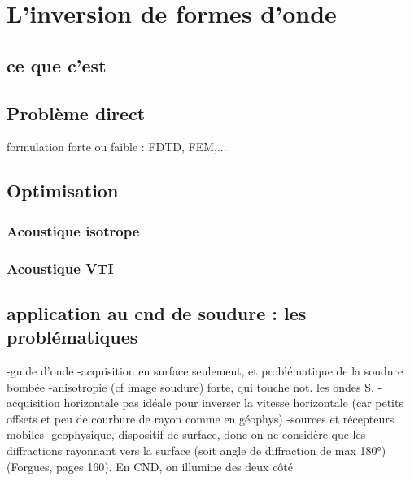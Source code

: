 \chapter{L'inversion de formes d'onde}

\section{ce que c'est}

\section{Problème direct}
formulation forte ou faible : 
FDTD, FEM,...

\section{Optimisation}

\subsection{Acoustique isotrope}
\subsection{Acoustique VTI}




\section{application au cnd de soudure : les problématiques}

-guide d'onde
-acquisition en surface seulement, et problématique de la soudure bombée
-anisotropie (cf image soudure) forte, qui touche not. les ondes S.
-acquisition horizontale pas idéale pour inverser la vitesse horizontale (car petits offsets et peu de courbure de rayon comme en géophys)
-sources et récepteurs mobiles 
-geophysique, dispositif de surface, donc on ne considère que les diffractions rayonnant vers la surface (soit angle de diffraction de max 180°)(Forgues, pages 160). En CND, on illumine des deux côté


